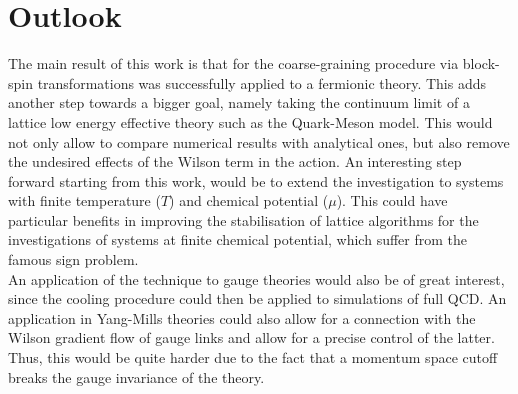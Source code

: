 \section*{Outlook}
The main result of this work is that for the coarse-graining procedure via block-spin transformations was successfully applied to a fermionic theory. This adds another step towards a bigger goal, namely taking the continuum limit of a lattice low energy effective theory such as the Quark-Meson model. 
This would not only allow to compare numerical results with analytical ones, but also remove the undesired effects of the Wilson term in the action. An interesting step forward starting from this work, would be to extend the investigation to  systems with finite temperature ($T$) and chemical potential ($\mu$). 
This could have particular benefits in improving the stabilisation of lattice algorithms for the investigations of systems at finite chemical potential, which suffer from the famous sign problem. \\
An application of the technique to gauge theories would also be of great interest, since the cooling procedure could then be applied to simulations of full QCD.  
An application in Yang-Mills theories could also allow for a connection with the Wilson gradient flow of gauge links and allow for a precise control of the latter. Thus, this would be quite harder due to the fact that a momentum space cutoff breaks the gauge invariance of the theory.